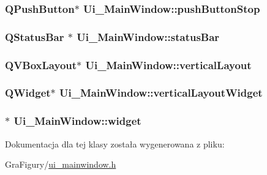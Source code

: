 \hypertarget{classUi__MainWindow_a7ffebcd872c64954df2f113b5c5a40c4}{
\subsubsection[{push\-Button\-Stop}]{\setlength{\rightskip}{0pt plus 5cm}Q\-Push\-Button$\ast$ Ui\-\_\-\-Main\-Window\-::push\-Button\-Stop}}\label{classUi__MainWindow_a7ffebcd872c64954df2f113b5c5a40c4}
\hypertarget{classUi__MainWindow_afa919f3af6f2f526a70f1fa331f63724}{
\subsubsection[{status\-Bar}]{\setlength{\rightskip}{0pt plus 5cm}Q\-Status\-Bar $\ast$ Ui\-\_\-\-Main\-Window\-::status\-Bar}}\label{classUi__MainWindow_afa919f3af6f2f526a70f1fa331f63724}
\hypertarget{classUi__MainWindow_aecd96a04789fcfec3f98d80390ad8184}{
\subsubsection[{vertical\-Layout}]{\setlength{\rightskip}{0pt plus 5cm}Q\-V\-Box\-Layout$\ast$ Ui\-\_\-\-Main\-Window\-::vertical\-Layout}}\label{classUi__MainWindow_aecd96a04789fcfec3f98d80390ad8184}
\hypertarget{classUi__MainWindow_a805d415fff07a22a85219e1f22f2da28}{
\subsubsection[{vertical\-Layout\-Widget}]{\setlength{\rightskip}{0pt plus 5cm}Q\-Widget$\ast$ Ui\-\_\-\-Main\-Window\-::vertical\-Layout\-Widget}}\label{classUi__MainWindow_a805d415fff07a22a85219e1f22f2da28}
\hypertarget{classUi__MainWindow_a53bd42b7570ff9a0e4529859b6551a28}{
\subsubsection[{widget}]{$\ast$ Ui\-\_\-\-Main\-Window\-::widget}}\label{classUi__MainWindow_a53bd42b7570ff9a0e4529859b6551a28}


Dokumentacja dla tej klasy została wygenerowana z pliku\-:\begin{DoxyCompactItemize}
\item 
Gra\-Figury/\hyperlink{GraFigury_2ui__mainwindow_8h}{ui\-\_\-mainwindow.\-h}\end{DoxyCompactItemize}
